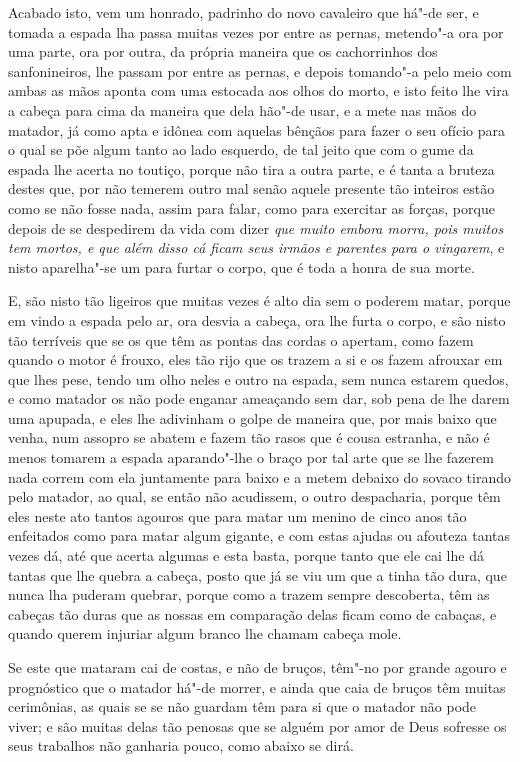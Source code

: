 Acabado isto, vem um honrado, padrinho do novo cavaleiro que há"-de
ser, e tomada a espada lha passa muitas vezes por entre as pernas,
metendo"-a ora por uma parte, ora por outra, da própria maneira que os
cachorrinhos dos sanfonineiros, lhe passam por entre as pernas, e
depois tomando"-a pelo meio com ambas as mãos aponta com uma estocada
aos olhos do morto, e isto feito lhe vira a cabeça para cima da maneira
que dela hão"-de usar, e a mete nas mãos do matador, já como apta e
idônea com aquelas bênçãos para fazer o seu ofício para o qual se põe
algum tanto ao lado esquerdo, de tal jeito que com o gume da espada
lhe acerta no toutiço, porque não tira a outra parte, e é tanta a
bruteza destes que, por não temerem outro mal senão aquele presente tão
inteiros estão como se não fosse nada, assim para falar, como para
exercitar as forças, porque depois de se despedirem da vida com dizer
\textit{que muito embora morra, pois muitos tem mortos, e que além
disso cá ficam seus irmãos e parentes para o vingarem}, e nisto
aparelha"-se um para furtar o corpo, que é toda a honra de sua morte. 

E, são nisto tão ligeiros que muitas vezes é alto dia sem o poderem
matar, porque em vindo a espada pelo ar, ora desvia a cabeça, ora lhe
furta o corpo, e são nisto tão terríveis que se os que têm as pontas
das cordas o apertam, como fazem quando o motor é frouxo, eles tão rijo
que os trazem a si e os fazem afrouxar em que lhes pese, tendo um olho
neles e outro na espada, sem nunca estarem quedos, e como matador os
não pode enganar ameaçando sem dar, sob pena de lhe darem uma apupada,
e eles lhe adivinham o golpe de maneira que, por mais baixo que venha,
num assopro se abatem e fazem tão rasos que é cousa estranha, e não é
menos tomarem a espada aparando"-lhe o braço por tal arte que se lhe
fazerem nada correm com ela juntamente para baixo e a metem debaixo do
sovaco tirando pelo matador, ao qual, se então não acudissem, o outro
despacharia, porque têm eles neste ato tantos agouros que para matar
um menino de cinco anos tão enfeitados como para matar algum gigante, e
com estas ajudas ou afouteza tantas vezes dá, até que acerta algumas e
esta basta, porque tanto que ele cai lhe dá tantas que lhe quebra a
cabeça, posto que já se viu um que a tinha tão dura, que nunca lha
puderam quebrar, porque como a trazem sempre descoberta, têm as cabeças
tão duras que as nossas em comparação delas ficam como de cabaças, e
quando querem injuriar algum branco lhe chamam cabeça mole.

 Se este que mataram cai de costas, e não de bruços, têm"-no por grande
agouro e prognóstico que o matador há"-de morrer, e ainda que caia de
bruços têm muitas cerimônias, as quais se se não guardam têm para si
que o matador não pode viver; e são muitas delas tão penosas que se
alguém por amor de Deus sofresse os seus trabalhos não ganharia pouco,
como abaixo se dirá.

